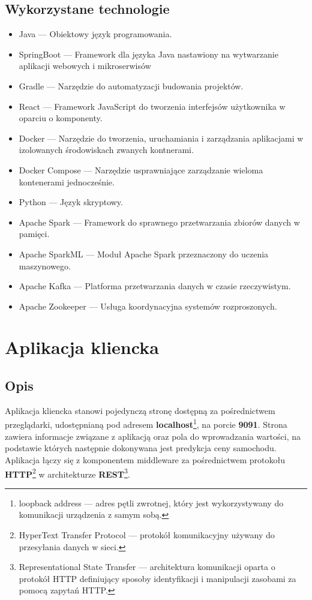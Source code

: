 \documentclass[12pt, a4paper]{report}
\begin{document}
\section{Wykorzystane technologie}
\begin{itemize}
    \item Java --- Obiektowy język programowania.
    \item SpringBoot --- Framework dla języka Java nastawiony na wytwarzanie aplikacji webowych i mikroserwisów
    \item Gradle --- Narzędzie do automatyzacji budowania projektów.
    \item React --- Framework JavaScript do tworzenia interfejsów użytkownika w oparciu o komponenty.
    \item Docker --- Narzędzie do tworzenia, uruchamiania i zarządzania aplikacjami w izolowanych środowiskach zwanych kontnerami.
    \item Docker Compose --- Narzędzie usprawniające zarządzanie wieloma kontenerami jednocześnie.
    \item Python --- Język skryptowy. 
    \item Apache Spark --- Framework do sprawnego przetwarzania zbiorów danych w pamięci.
    \item Apache SparkML --- Moduł Apache Spark przeznaczony do uczenia maszynowego.
    \item Apache Kafka --- Platforma przetwarzania danych w czasie rzeczywistym.
    \item Apache Zookeeper --- Usługa koordynacyjna systemów rozproszonych.
\end{itemize}

\chapter{Aplikacja kliencka}
\section{Opis}
Aplikacja kliencka stanowi pojedynczą stronę dostępną za pośrednictwem przeglądarki,
udostępnianą pod adresem \textbf{localhost}\footnote{loopback address --- adres pętli zwrotnej, który jest wykorzystywany do komunikacji urządzenia z samym sobą.},
na porcie \textbf{9091}. Strona zawiera informacje związane z aplikacją oraz pola do wprowadzania wartości,
na podstawie których następnie dokonywana jest predykcja ceny samochodu. Aplikacja łączy się z komponentem
middleware za pośrednictwem protokołu \textbf{HTTP}\footnote{HyperText Transfer Protocol --- protokół komunikacyjny używany do przesyłania danych w sieci.}
 w architekturze 
\textbf{REST}\footnote{Representational State Transfer --- architektura komunikacji oparta o protokół HTTP
    definiujący sposoby identyfikacji i manipulacji zasobami za pomocą zapytań HTTP.}.\@
\end{document}
